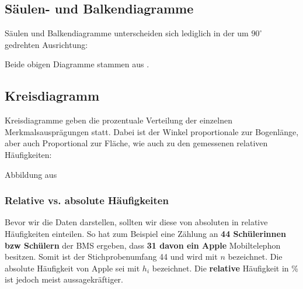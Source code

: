 \subsection{Säulen- und
  Balkendiagramme}
Säulen und Balkendiagramme unterscheiden sich lediglich in der um $90^\circ$ gedrehten Ausrichtung:
\begin{center}
\end{center}
Beide obigen Diagramme stammen aus \cite{marthaler21alg}.

\subsection{Kreisdiagramm}
Kreisdiagramme geben die prozentuale Verteilung der einzelnen Merkmalsausprägungen statt. Dabei ist der Winkel proportionale zur Bogenlänge, aber auch Proportional zur Fläche, wie auch zu den gemessenen relativen Häufigkeiten:


Abbildung aus \cite{marthaler21alg}
\newpage

\subsubsection{Relative vs. absolute Häufigkeiten}

Bevor wir die Daten darstellen, sollten wir diese von absoluten in
relative Häufigkeiten einteilen. So hat zum Beispiel eine Zählung an
\textbf{44 Schülerinnen bzw Schülern} der BMS ergeben, dass \textbf{31
  davon ein Apple} Mobiltelephon besitzen. Somit ist der Stichprobenumfang 44 und wird mit $n$
bezeichnet. Die absolute Häufigkeit von Apple sei mit $h_i$
bezeichnet. Die \textbf{relative} Häufigkeit in \% ist
jedoch meist aussagekräftiger.

